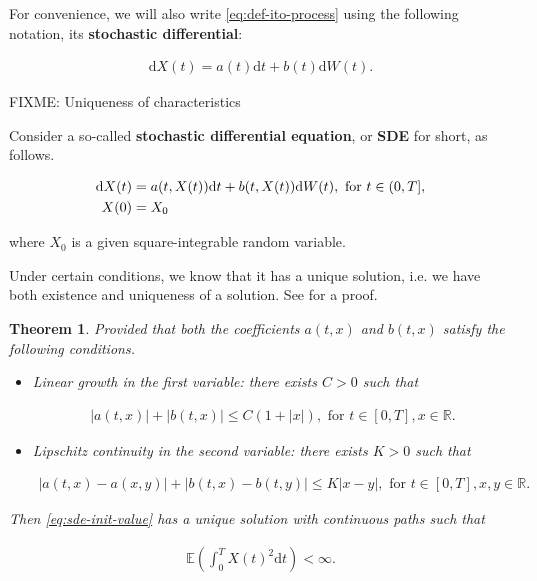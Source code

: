 \documentclass[a4paper]{article}
\newtheorem{theorem}[definition]{Theorem}
\begin{document}
For convenience, we will also write \eqref{eq:def-ito-process} using the following notation, its \textbf{stochastic differential}:

\begin{align}\label{eq:stoch-diff-notation}
  \mathrm{d}X(t) = a(t) \mathrm{d}t + b(t) \mathrm{d}W(t).
\end{align}

FIXME: Uniqueness of characteristics

Consider a so-called \textbf{stochastic differential equation}, or \textbf{SDE} for short, as follows.

\begin{align}\label{eq:sde-init-value}
  \mathrm{d}X(t) &= a(t,X(t)) \mathrm{d}t + b(t,X(t)) \mathrm{d}W(t), \text{ for } t \in (0,T],\\
  X(0) &= X_0\notag
\end{align}

where $X_0$ is a given square-integrable random variable.

Under certain conditions, we know that it has a unique solution, i.e. we have both existence and uniqueness of a solution. See \textcite{capinski_stochastic_2012} for a proof.

\begin{theorem}\label{eq:sde-solution}
  Provided that both the coefficients $a(t,x)$ and $b(t,x)$ satisfy the following conditions.

  \begin{itemize}
    \item Linear growth in the first variable: there exists $C > 0$ such that

      \begin{align*}
        |a(t,x)| + |b(t,x)| \le C (1 + |x|), \text{ for } t \in [0,T], x \in \mathbb{R}.
      \end{align*}

    \item Lipschitz continuity in the second variable: there exists $K > 0$ such that

      \begin{align*}
        |a(t,x) - a(x,y)| + |b(t,x) - b(t,y)| \le K |x-y|, \text{ for } t \in [0,T], x,y \in \mathbb{R}.
      \end{align*}
  \end{itemize}

  Then \eqref{eq:sde-init-value} has a unique solution with continuous paths such that

  \begin{align*}
    \mathbb{E}\left(\int_0^T X(t)^2 \mathrm{d}t\right) < \infty.
  \end{align*}
\end{theorem}
\end{document}
